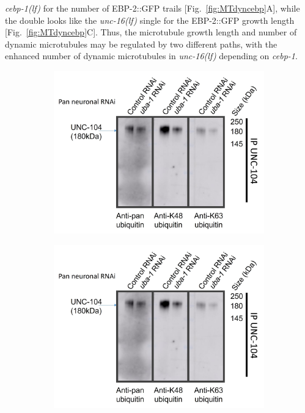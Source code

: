 \begin{appendices}
	  \textit{cebp-1(lf)} for the number of EBP-2::GFP trails [Fig.~\ref{fig:MTdyncebp}A], while the double looks like the \textit{unc-16(lf)} single for the EBP-2::GFP growth length [Fig.~\ref{fig:MTdyncebp}C]. Thus, the microtubule growth length and number of dynamic microtubules may be regulated by two different paths, with the enhanced number of dynamic microtubules in \textit{unc-16(lf)} depending on \textit{cebp-1}.
	
	
	\begin{figure}[H]
		\centering
		\begin{subfigure}{0.32\textwidth}
			\caption{}
			\includegraphics[width=\textwidth]{figs/example}
			
		\end{subfigure}
		\begin{subfigure}{0.32\textwidth}
			\caption{}
			\includegraphics[width=\textwidth]{figs/example}
			

\end{subfigure}
\end{figure}
\end{appendices}
